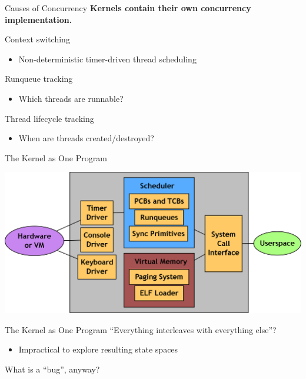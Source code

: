 \documentclass[xcolor=dvipsnames]{beamer}
\begin{document}
\begin{frame}{Causes of Concurrency} %
	\textbf{Kernels contain their own concurrency implementation.}

	\linegap
	Context switching
	\begin{itemize}
		\item Non-deterministic timer-driven thread scheduling
	\end{itemize}
	Runqueue tracking
	\begin{itemize}
		\item Which threads are runnable?
	\end{itemize}
	Thread lifecycle tracking
	\begin{itemize}
		\item When are threads created/destroyed?
	\end{itemize}
\end{frame}

%	
%	

\begin{frame}{The Kernel as One Program} %
	\begin{center}
	\includegraphics[width=\textwidth]{pebbles.png}
	\end{center}
\end{frame}
\begin{frame}{The Kernel as One Program} %
	``Everything interleaves with everything else''?
	\begin{itemize}
		\item Impractical to explore resulting state spaces
	\end{itemize}
	\linegap

	What is a ``bug'', anyway?
\end{frame}
\end{document}
